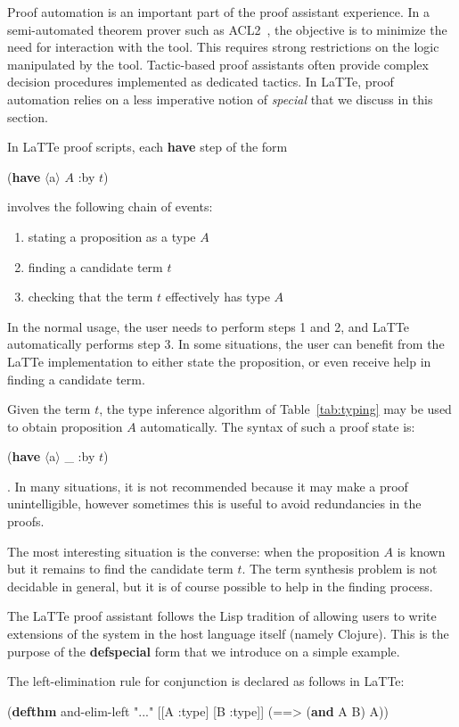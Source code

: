 \documentclass{styles/sig-alternate-05-2015}
\newcommand{\kw}[1]{\textbf{#1}}
\newcommand{\code}[1]{\begin{sffamily}{\small #1}\end{sffamily}}
\begin{document}
Proof automation is an important part of the proof assistant experience.
In a semi-automated theorem prover such as ACL2~\cite{acl2:Kaufmann:2000},
the objective is to minimize the need for interaction with the tool.
This requires strong restrictions on the logic manipulated by the tool.
Tactic-based proof assistants often provide complex decision procedures
implemented as dedicated tactics. In LaTTe, proof automation relies on
 a less imperative notion of  \emph{special} that we discuss in this section.

In LaTTe proof scripts, each \kw{have} step of the form
 \code{(\kw{have} $\langle$a$\rangle$ $A$ :by $t$)}
involves the following chain of events:
\begin{enumerate}
\item stating a proposition as a type $A$
\item finding a candidate term $t$
\item checking that the term $t$ effectively has type $A$
\end{enumerate}

In the normal usage, the user needs to perform steps 1 and 2, and 
LaTTe automatically performs step 3. In some situations, the user can
benefit from the LaTTe implementation to either state the proposition,
or even receive help in finding a candidate term.

Given the term $t$, the type inference algorithm of Table~\ref{tab:typing}
may be used to obtain proposition $A$ automatically. The syntax
of such a proof state is: \code{(\kw{have} $\langle$a$\rangle$ \_ :by $t$)}.
In many situations, it is not recommended because it may make a proof unintelligible,
however sometimes this is useful to avoid redundancies in the proofs.

The most interesting situation is the converse: when the proposition $A$ is known but
it remains to find the candidate term $t$. The term synthesis problem is
not decidable in general, but it is of course possible to help in the
finding process.

The LaTTe proof assistant follows the Lisp tradition of allowing users to write extensions of
the system in the host language itself (namely Clojure). This is the purpose of the \kw{defspecial} form that
we introduce on a simple example.

The left-elimination rule for conjunction is declared as follows in LaTTe:

\begin{program}
(\kw{defthm} and-elim-left "..."
  [[A :type] [B :type]]
  (==> (\kw{and} A B)
       A))
\end{program}
\end{document}
